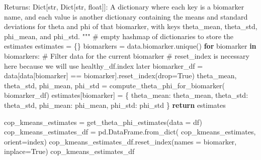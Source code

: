 \documentclass[
  letterpaper,
  DIV=11,
  numbers=noendperiod]{scrreprt}
\newenvironment{Shaded}{\begin{snugshade}}{\end{snugshade}}
\newcommand{\CommentTok}[1]{\textcolor[rgb]{0.37,0.37,0.37}{#1}}
\newcommand{\ControlFlowTok}[1]{\textcolor[rgb]{0.00,0.23,0.31}{\textbf{#1}}}
\newcommand{\KeywordTok}[1]{\textcolor[rgb]{0.00,0.23,0.31}{\textbf{#1}}}
\newcommand{\NormalTok}[1]{\textcolor[rgb]{0.00,0.23,0.31}{#1}}
\newcommand{\OperatorTok}[1]{\textcolor[rgb]{0.37,0.37,0.37}{#1}}
\newcommand{\StringTok}[1]{\textcolor[rgb]{0.13,0.47,0.30}{#1}}
\newcommand{\VariableTok}[1]{\textcolor[rgb]{0.07,0.07,0.07}{#1}}
\begin{document}
\begin{Shaded}
\begin{Highlighting}[]
\CommentTok{    Returns:}
\CommentTok{    Dict[str, Dict[str, float]]: A dictionary where each key is a biomarker name,}
\CommentTok{        and each value is another dictionary containing the means and standard deviations }
\CommentTok{        for theta and phi of that biomarker, with keys \textquotesingle{}theta\_mean\textquotesingle{}, \textquotesingle{}theta\_std\textquotesingle{}, \textquotesingle{}phi\_mean\textquotesingle{}, }
\CommentTok{        and \textquotesingle{}phi\_std\textquotesingle{}.}
\CommentTok{    """}
    \CommentTok{\# empty hashmap of dictionaries to store the estimates}
\NormalTok{    estimates }\OperatorTok{=}\NormalTok{ \{\}}
\NormalTok{    biomarkers }\OperatorTok{=}\NormalTok{ data.biomarker.unique()}
    \ControlFlowTok{for}\NormalTok{ biomarker }\KeywordTok{in}\NormalTok{ biomarkers:}
        \CommentTok{\# Filter data for the current biomarker}
        \CommentTok{\# reset\_index is necessary here because we will use healthy\_df.index later}
\NormalTok{        biomarker\_df }\OperatorTok{=}\NormalTok{ data[data[}\StringTok{\textquotesingle{}biomarker\textquotesingle{}}\NormalTok{]}
                            \OperatorTok{==}\NormalTok{ biomarker].reset\_index(drop}\OperatorTok{=}\VariableTok{True}\NormalTok{)}
\NormalTok{        theta\_mean, theta\_std, phi\_mean, phi\_std }\OperatorTok{=}\NormalTok{ compute\_theta\_phi\_for\_biomarker(}
\NormalTok{            biomarker\_df)}
\NormalTok{        estimates[biomarker] }\OperatorTok{=}\NormalTok{ \{}
            \StringTok{\textquotesingle{}theta\_mean\textquotesingle{}}\NormalTok{: theta\_mean,}
            \StringTok{\textquotesingle{}theta\_std\textquotesingle{}}\NormalTok{: theta\_std,}
            \StringTok{\textquotesingle{}phi\_mean\textquotesingle{}}\NormalTok{: phi\_mean,}
            \StringTok{\textquotesingle{}phi\_std\textquotesingle{}}\NormalTok{: phi\_std}
\NormalTok{        \}}
    \ControlFlowTok{return}\NormalTok{ estimates}
\end{Highlighting}
\end{Shaded}

\begin{Shaded}
\begin{Highlighting}[]
\NormalTok{cop\_kmeans\_estimates }\OperatorTok{=}\NormalTok{ get\_theta\_phi\_estimates(data }\OperatorTok{=}\NormalTok{ df)}
\NormalTok{cop\_kmeans\_estimates\_df }\OperatorTok{=}\NormalTok{ pd.DataFrame.from\_dict(}
\NormalTok{    cop\_kmeans\_estimates, orient}\OperatorTok{=}\StringTok{\textquotesingle{}index\textquotesingle{}}\NormalTok{)}
\NormalTok{cop\_kmeans\_estimates\_df.reset\_index(names }\OperatorTok{=} \StringTok{\textquotesingle{}biomarker\textquotesingle{}}\NormalTok{, inplace}\OperatorTok{=}\VariableTok{True}\NormalTok{)}
\NormalTok{cop\_kmeans\_estimates\_df}
\end{Highlighting}
\end{Shaded}
\end{document}
